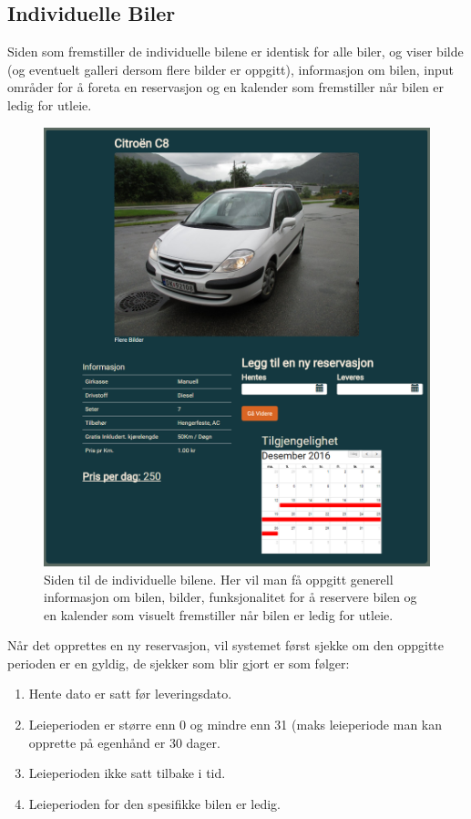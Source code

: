 \subsection{Individuelle Biler}
Siden som fremstiller de individuelle bilene er identisk for alle biler, og viser bilde (og eventuelt galleri dersom flere bilder er oppgitt), informasjon om bilen, input områder for å foreta en reservasjon og en kalender som fremstiller når bilen er ledig for utleie.

 \begin{figure}[htbp]
	\centering
		\includegraphics[scale=0.3]{Bilder/rv_individualcar.png}
	\caption[Individuelle Biler]{ Siden til de individuelle bilene. Her vil man få oppgitt generell informasjon om bilen, bilder, funksjonalitet for å reservere bilen og en kalender som visuelt fremstiller når bilen er ledig for utleie.} %
	\label{fig:rv_individualcar}
\end{figure}

Når det opprettes en ny reservasjon, vil systemet først sjekke om den oppgitte perioden er en gyldig, de sjekker som blir gjort er som følger:
\begin{enumerate}
\item Hente dato er satt før leveringsdato.
\item Leieperioden er større enn 0 og mindre enn 31 (maks leieperiode man kan opprette på egenhånd er 30 dager.
\item Leieperioden ikke satt tilbake i tid.
\item Leieperioden for den spesifikke bilen er ledig.
\end{enumerate}

